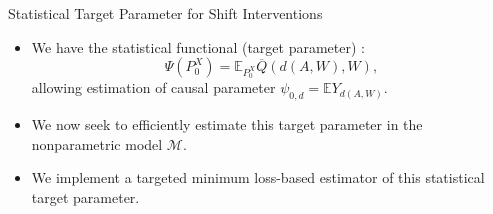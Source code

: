\documentclass{beamer}
\newcommand{\E}{\mathbb{E}}
\newcommand{\M}{\mathcal{M}}
\begin{document}

\begin{frame}[c]{Statistical Target Parameter for Shift Interventions}

\begin{center}
\begin{itemize}
  \itemsep10pt
  \item We have the statistical functional (target parameter)
    \citep{diaz2012population}:
    \begin{equation*}
      \Psi(P_0^X) = \E_{P_0^X}{\overline{Q}(d(A, W), W)},
    \end{equation*}
    allowing estimation of causal parameter $\psi_{0,d} = \E Y_{d(A, W)}$.
  \item We now seek to efficiently estimate this target parameter in the
    nonparametric model $\M$.
  \item We implement a targeted minimum loss-based estimator of this statistical
    target parameter.
\end{itemize}
\end{center}


\end{frame}

\end{document}
